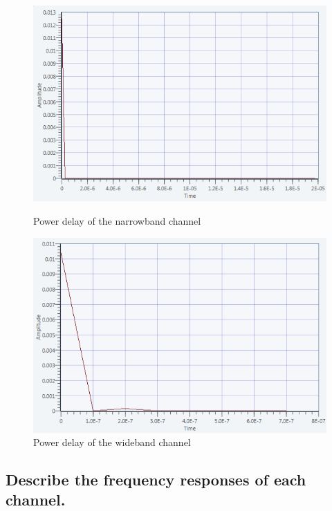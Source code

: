 \documentclass[frenchb, oneside, headings=normal]{scrartcl}
\begin{document}
\begin{figure}[!ht]
    \begin{minipage}[b]{0.48\linewidth}
        \centering \includegraphics[scale=0.45]{img/power_delay_narrow.png}
     \caption{Power delay of the narrowband channel}
     \label{fig4}
    \end{minipage}\hfill
    \begin{minipage}[b]{0.48\linewidth}
         \centering \includegraphics[scale=0.45]{img/power_delay_wideband.png}
 \caption{Power delay of the wideband channel}\label{fig5}
    \end{minipage}
\end{figure}
\subsection{Describe the frequency responses of each channel.}
\end{document}
